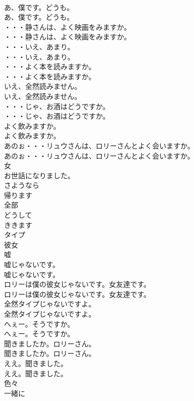 \documentclass[8pt]{extreport}
\begin{document}
\begin{CJK}{UTF8}{min}
\\	あ、僕です。どうも。	
\\	あ、僕です。どうも。 
\\	・・・静さんは、よく映画をみますか。	
\\	・・・静さんは、よく映画をみますか。 
\\	・・・いえ、あまり。	
\\	・・・いえ、あまり。 
\\	・・・よく本を読みますか。	
\\	・・・よく本を読みますか。 
\\	いえ、全然読みません。	
\\	いえ、全然読みません。 
\\	・・・じゃ、お酒はどうですか。	
\\	・・・じゃ、お酒はどうですか。 
\\	よく飲みますか。	
\\	よく飲みますか。 
\\	あのぉ・・・リュウさんは、ロリーさんとよく会いますか。	
\\	あのぉ・・・リュウさんは、ロリーさんとよく会いますか。 
\\	女
\\	お世話になりました。
\\	さようなら
\\	帰ります
\\	全部
\\	どうして
\\	ききます
\\	タイプ
\\	彼女
\\	嘘
\\	嘘じゃないです。	
\\	嘘じゃないです。 
\\	ロリーは僕の彼女じゃないです。女友達です。	
\\	ロリーは僕の彼女じゃないです。女友達です。 
\\	全然タイプじゃないですよ。	
\\	全然タイプじゃないですよ。 
\\	へぇー。そうですか。	
\\	へぇー。そうですか。 
\\	聞きましたか。ロリーさん。	
\\	聞きましたか。ロリーさん。 
\\	ええ。聞きました。	
\\	ええ。聞きました。 
\\	色々
\\	一緒に

\end{CJK}
\end{document}
